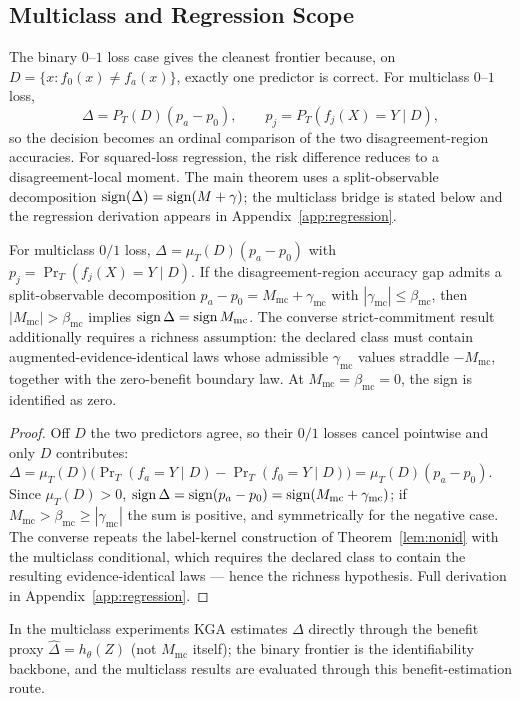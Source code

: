 \subsection{Multiclass and Regression Scope}
The binary $0$--$1$ loss case gives the cleanest frontier because, on $D=\{x:f_0(x)\neq f_a(x)\}$, exactly one predictor is correct. For multiclass $0$--$1$ loss,
\[
\Delta=P_T(D)(p_a-p_0),\qquad p_j=P_T(f_j(X)=Y\mid D),
\]
so the decision becomes an ordinal comparison of the two disagreement-region accuracies. For squared-loss regression, the risk difference reduces to a disagreement-local moment. The main theorem uses a split-observable decomposition $\operatorname{sign}(\Delta)=\operatorname{sign}(M+\gamma)$; the multiclass bridge is stated below and the regression derivation appears in Appendix~\ref{app:regression}.

\begin{proposition}\label{prop:multiclass}
For multiclass $0/1$ loss, $\Delta=\mu_T(D)(p_a-p_0)$ with $p_j=\Pr_T(f_j(X){=}Y\mid D)$. If the
disagreement-region accuracy gap admits a split-observable decomposition
$p_a-p_0=M_{\mathrm{mc}}+\gamma_{\mathrm{mc}}$ with $|\gamma_{\mathrm{mc}}|\le\beta_{\mathrm{mc}}$, then
$|M_{\mathrm{mc}}|>\beta_{\mathrm{mc}}$ implies $\operatorname{sign}\Delta=\operatorname{sign} M_{\mathrm{mc}}$. The converse
strict-commitment result additionally requires a richness assumption: the declared class must contain
augmented-evidence-identical laws whose admissible $\gamma_{\mathrm{mc}}$ values straddle
$-M_{\mathrm{mc}}$, together with the zero-benefit boundary law. At
$M_{\mathrm{mc}}=\beta_{\mathrm{mc}}=0$, the sign is identified as zero.
\end{proposition}
\begin{proof}
Off $D$ the two predictors agree, so their $0/1$ losses cancel pointwise and only $D$ contributes:
$\Delta=\mu_T(D)\bigl(\Pr_T(f_a{=}Y\mid D)-\Pr_T(f_0{=}Y\mid D)\bigr)=\mu_T(D)(p_a-p_0)$. Since
$\mu_T(D)>0$, $\operatorname{sign}\Delta=\operatorname{sign}(p_a-p_0)=\operatorname{sign}(M_{\mathrm{mc}}+\gamma_{\mathrm{mc}})$; if
$M_{\mathrm{mc}}>\beta_{\mathrm{mc}}\ge|\gamma_{\mathrm{mc}}|$ the sum is positive, and symmetrically
for the negative case. The converse repeats the label-kernel construction of
Theorem~\ref{lem:nonid} with the multiclass conditional, which requires the declared class to
contain the resulting evidence-identical laws --- hence the richness hypothesis. Full derivation in
Appendix~\ref{app:regression}.
\end{proof}
\noindent In the multiclass experiments \textsc{KGA} estimates $\Delta$ directly through the benefit
proxy $\widehat\Delta=h_\theta(Z)$ (not $M_{\mathrm{mc}}$ itself); the binary frontier is the
identifiability backbone, and the multiclass results are evaluated through this benefit-estimation route.

